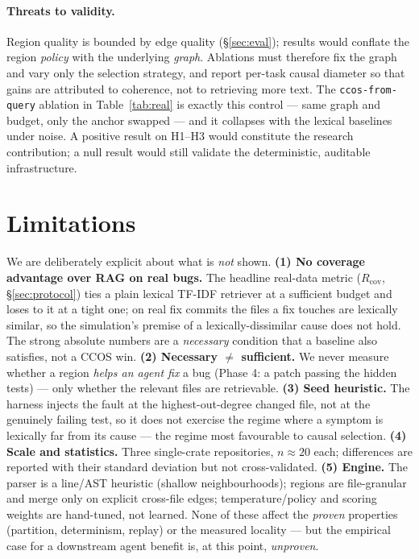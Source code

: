 \documentclass[11pt]{article}
\newcommand{\code}[1]{\texttt{#1}}
\begin{document}
\paragraph{Threats to validity.} Region quality is bounded by edge quality
(\S\ref{sec:eval}); results would conflate the region \emph{policy} with the
underlying \emph{graph}. Ablations must therefore fix the graph and vary only the
selection strategy, and report per-task causal diameter so that gains are
attributed to coherence, not to retrieving more text. The \code{ccos-from-query}
ablation in Table~\ref{tab:real} is exactly this control --- same graph and
budget, only the anchor swapped --- and it collapses with the lexical baselines
under noise. A positive result on H1--H3 would constitute the research
contribution; a null result would still validate the deterministic, auditable
infrastructure.

\section{Limitations}

We are deliberately explicit about what is \emph{not} shown.
\textbf{(1) No coverage advantage over RAG on real bugs.} The headline real-data
metric ($R_{\mathrm{cov}}$, \S\ref{sec:protocol}) ties a plain lexical TF-IDF
retriever at a sufficient budget and loses to it at a tight one; on real fix
commits the files a fix touches are lexically similar, so the simulation's premise
of a lexically-dissimilar cause does not hold. The strong absolute numbers are a
\emph{necessary} condition that a baseline also satisfies, not a CCOS win.
\textbf{(2) Necessary $\neq$ sufficient.} We never measure whether a region
\emph{helps an agent fix} a bug (Phase 4: a patch passing the hidden tests) ---
only whether the relevant files are retrievable.
\textbf{(3) Seed heuristic.} The harness injects the fault at the
highest-out-degree changed file, not at the genuinely failing test, so it does not
exercise the regime where a symptom is lexically far from its cause --- the regime
most favourable to causal selection.
\textbf{(4) Scale and statistics.} Three single-crate repositories, $n\!\approx\!20$
each; differences are reported with their standard deviation but not cross-validated.
\textbf{(5) Engine.} The parser is a line/AST heuristic (shallow neighbourhoods);
regions are file-granular and merge only on explicit cross-file edges;
temperature/policy and scoring weights are hand-tuned, not learned. None of these
affect the \emph{proven} properties (partition, determinism, replay) or the
measured locality --- but the empirical case for a downstream agent benefit is, at
this point, \emph{unproven}.
\end{document}
